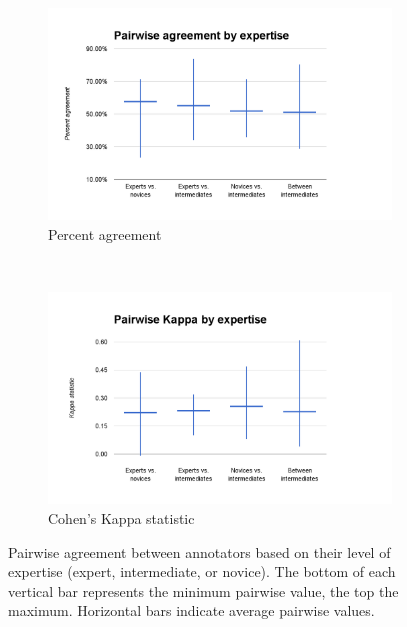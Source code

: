 		\begin{figure}[htb]
			\centering
			
			\begin{subfigure}[b]{.5\textwidth}
				\centering
				\includegraphics[width=\textwidth]{img/annotation/pairAgreeExpertise}
				\caption{Percent agreement}
				\label{fig:agreement:expertise:pct}
			\end{subfigure}%
			~
			\begin{subfigure}[b]{.5\textwidth}
				\centering
				\includegraphics[width=\textwidth]{img/annotation/pairKappaExpertise}
				\caption{Cohen's Kappa statistic}
				\label{fig:agreement:expertise:k}
			\end{subfigure}%
			
			\caption[Pairwise agreement statistics by annotator expertise]{Pairwise agreement between annotators based on their level of expertise (expert, intermediate, or novice). The bottom of each vertical bar represents the minimum pairwise value, the top the maximum. Horizontal bars indicate average pairwise values.}
			\label{fig:agreement:expertise}
		\end{figure}
		
